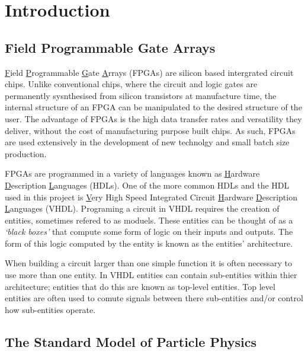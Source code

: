\section{Introduction}

  \subsection{Field Programmable Gate Arrays}

    \underline{F}ield \underline{P}rogrammable \underline{G}ate \underline{A}rrays (FPGAs) are silicon based intergrated circuit chips.
    Unlike conventional chips, where the circuit and logic gates are permanently sysnthesised from silicon transistors at manufacture time, the internal structure of an FPGA can be manipulated to the desired structure of the user.
    The advantage of FPGAs is the high data transfer rates and versatility they deliver, without the cost of manufacturing purpose built chips. 
    As such, FPGAs are used extensively in the development of new technolgy and small batch size production. \cite{fpga}
    \par
    FPGAs are programmed in a variety of languages known as \underline{H}ardware \underline{D}escription \underline{L}anguages (HDLs).
    One of the more common HDLs and the HDL used in this project is \underline{V}ery High Speed Integrated Circuit \underline{H}ardware \underline{D}escription \underline{L}anguages (VHDL).
    Programing a circuit in VHDL requires the creation of entities, sometimes refered to as moduels.
    These entities can be thought of as a \textit{`black boxes'} that compute some form of logic on their inputs and outputs.
    The form of this logic computed by the entity is known as the entities' architecture.
    \par
    When building a circuit larger than one simple function it is often necessary to use more than one entity.
    In VHDL entities can contain sub-entities within thier architecture; entities that do this are known as top-level entities.
    Top level entities are often used to comute signals between there sub-entities and/or control how sub-entities operate.

	\subsection{The Standard Model of Particle Physics}


